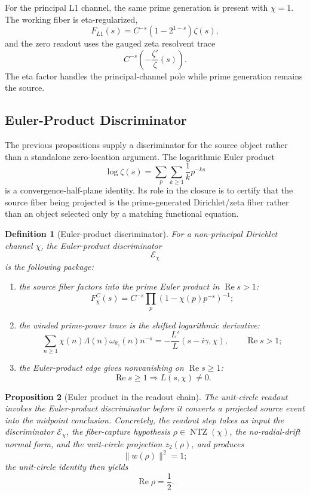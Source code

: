 \documentclass[11pt]{article}
\newtheorem{definition}{Definition}[section]
\newtheorem{proposition}[definition]{Proposition}
\DeclareMathOperator{\Ree}{Re}
\DeclareMathOperator{\NTZ}{NTZ}
\begin{document}
For the principal L1 channel, the same prime generation is present with
$\chi=1$.  The working fiber is eta-regularized,
\[
  F_{L1}(s)=C^{-s}(1-2^{1-s})\zeta(s),
\]
and the zero readout uses the gauged zeta resolvent trace
\[
  C^{-s}\left(-\frac{\zeta'}{\zeta}(s)\right).
\]
The eta factor handles the principal-channel pole while prime generation remains
the source.

\subsection{Euler-Product Discriminator}

The previous propositions supply a discriminator for the source object rather
than a standalone zero-location argument.
The logarithmic Euler product
\[
  \log\zeta(s)
  =
  \sum_p\sum_{k\ge1}\frac{1}{k}p^{-ks}
\]
is a convergence-half-plane identity.  Its role in the closure is to certify
that the source fiber being projected is the prime-generated Dirichlet/zeta
fiber rather than an object selected only by a matching functional equation.

\begin{definition}[Euler-product discriminator]
For a non-principal Dirichlet channel $\chi$, the Euler-product discriminator
\[
  \mathcal E_\chi
\]
is the following package:
\begin{enumerate}[label=(E\arabic*)]
\item the source fiber factors into the prime Euler product in $\Ree s>1$:
\[
  F_\chi^C(s)
  =
  C^{-s}\prod_p(1-\chi(p)p^{-s})^{-1};
\]
\item the winded prime-power trace is the shifted logarithmic derivative:
\[
  \sum_{n\ge1}\chi(n)\Lambda(n)\omega_{\theta_\gamma}(n)n^{-s}
  =
  -\frac{L'}{L}(s-i\gamma,\chi),
  \qquad \Ree s>1;
\]
\item the Euler-product edge gives nonvanishing on $\Ree s\ge1$:
\[
  \Ree s\ge1\Longrightarrow L(s,\chi)\ne0 .
\]
\end{enumerate}
\end{definition}

\begin{proposition}[Euler product in the readout chain]
The unit-circle readout invokes the Euler-product discriminator before it
converts a projected source event into the midpoint conclusion.  Concretely, the
readout step takes as input the discriminator $\mathcal E_\chi$, the
fiber-capture hypothesis $\rho\in\NTZ(\chi)$, the no-radial-drift normal form,
and the unit-circle projection $z_2(\rho)$, and produces
\[
  \lVert w(\rho)\rVert^2=1 ;
\]
the unit-circle identity then yields
\[
  \Ree\rho=\frac12.
\]
\end{proposition}
\end{document}
